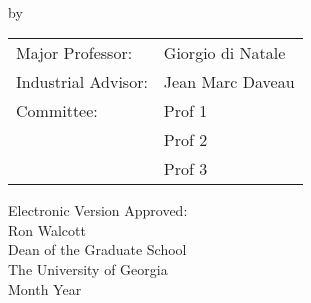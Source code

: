 \documentclass[12pt, notitlepage, twoside]{report}
\begin{document}

\newcommand{\degreesearned}{%
B.S., University of Rome "Tor Vergata", 2018\\
B.Sc., University of Rome "Tor Vergata", 2016
}%

\newcommand{\degreetype}{Dissertation}
\newcommand{\degreetitle}{Doctor of Philosophy}
\newcommand{\degreename}{Nano Electronics and Nano Technologies}
\newcommand{\degreeyear}{2023}
\maketitlepage





\newpage
\thispagestyle{empty}
\vspace*{18pt}
\begin{center}
  \textsc{\doctitle}\\[18pt]
  by\\[18pt]
  \textsc{\docauthor}
\end{center}
\vfill

\begin{flushright}
  \begin{tabular}{ll}
    Major Professor: & Giorgio di Natale \\ [8pt]
    Industrial Advisor: & Jean Marc Daveau \\ [8pt]
    Committee: & Prof 1 \\
    & Prof 2 \\
    & Prof 3 \\
  \end{tabular}
\end{flushright}

\vspace*{3cm}

\begin{flushleft}
  Electronic Version Approved:\\[12pt]
  Ron Walcott\\
  Dean of the Graduate School\\
  The University of Georgia\\
  Month Year
\end{flushleft}
\vspace*{1.5cm}




\end{document}
